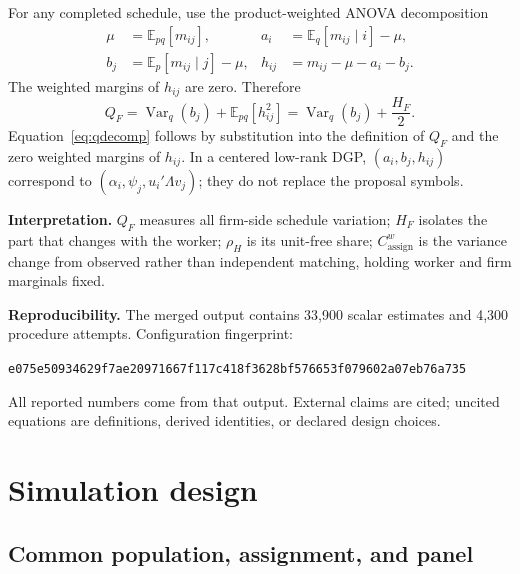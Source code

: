\documentclass[11pt]{article}
\newcommand{\E}{\mathbb{E}}
\newcommand{\Var}{\operatorname{Var}}
\newcommand{\QF}{Q_F}
\newcommand{\HF}{H_F}
\newcommand{\rhoH}{\rho_H}
\newcommand{\Cassign}{C^{w}_{\mathrm{assign}}}
\begin{document}
For any completed schedule, use the product-weighted ANOVA decomposition
\begin{align}
\mu&=\E_{pq}[m_{ij}],
&a_i&=\E_q[m_{ij}\mid i]-\mu,\\
b_j&=\E_p[m_{ij}\mid j]-\mu,
&h_{ij}&=m_{ij}-\mu-a_i-b_j. \label{eq:anova}
\end{align}
The weighted margins of $h_{ij}$ are zero.  Therefore
\begin{equation}
\QF=\Var_q(b_j)+\E_{pq}[h_{ij}^2]
=\Var_q(b_j)+\frac{\HF}{2}. \label{eq:qdecomp}
\end{equation}
Equation~\eqref{eq:qdecomp} follows by substitution into the definition of
$\QF$ and the zero weighted margins of $h_{ij}$.  In a centered low-rank DGP,
$(a_i,b_j,h_{ij})$ correspond to
$(\alpha_i,\psi_j,u_i'\Lambda v_j)$; they do not replace the proposal symbols.

\textbf{Interpretation.} $\QF$ measures all firm-side schedule variation;
$\HF$ isolates the part that changes with the worker; $\rhoH$ is its unit-free
share; $\Cassign$ is the variance change from observed rather than independent
matching, holding worker and firm marginals fixed.

\begin{samepage}
\textbf{Reproducibility.} The merged output contains 33,900 scalar estimates
and 4,300 procedure attempts.  Configuration fingerprint:
\begin{center}
\small\texttt{e075e50934629f7ae20971667f117c418f3628bf576653f079602a07eb76a735}
\end{center}
All reported numbers come from that output.  External claims are cited;
uncited equations are definitions, derived identities, or declared design
choices.
\end{samepage}

\section{Simulation design}

\subsection{Common population, assignment, and panel}
\end{document}
